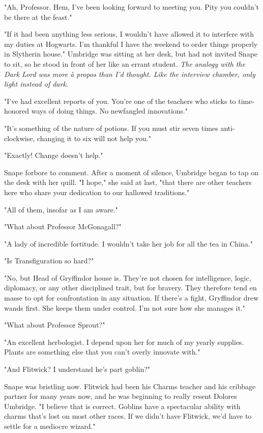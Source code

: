 "Ah, Professor. Hem, I've been looking forward to meeting you. Pity you couldn't be there at the feast."

"If it had been anything less serious, I wouldn't have allowed it to interfere with my duties at Hogwarts. I'm thankful I have the weekend to order things properly in Slytherin house." Umbridge was sitting at her desk, but had not invited Snape to sit, so he stood in front of her like an errant student. \emph{The analogy with the Dark Lord was more à propos than I'd thought. Like the interview chamber, only light instead of dark.}

"I've had excellent reports of you. You're one of the teachers who sticks to time-honored ways of doing things. No newfangled innovations."

"It's something of the nature of potions. If you must stir seven times anti-clockwise, changing it to six will not help you."

"Exactly! Change doesn't help."

Snape forbore to comment. After a moment of silence, Umbridge began to tap on the desk with her quill. "I hope," she said at last, "that there are other teachers here who share your dedication to our hallowed traditions."

"All of them, insofar as I am aware."

"What about Professor McGonagall?"

"A lady of incredible fortitude. I wouldn't take her job for all the tea in China."

"Is Transfiguration so hard?"

"No, but Head of Gryffindor house is. They're not chosen for intelligence, logic, diplomacy, or any other disciplined trait, but for bravery. They therefore tend en masse to opt for confrontation in any situation. If there's a fight, Gryffindor drew wands first. She keeps them under control. I'm not sure how she manages it."

"What about Professor Sprout?"

"An excellent herbologist. I depend upon her for much of my yearly supplies. Plants are something else that you can't overly innovate with."

"And Flitwick? I understand he's part{\el} goblin?"

Snape was bristling now. Flitwick had been his Charms teacher and his cribbage partner for many years now, and he was beginning to really resent Dolores Umbridge. "I believe that is correct. Goblins have a spectacular ability with charms that's lost on most other races. If we didn't have Flitwick, we'd have to settle for a mediocre wizard."

